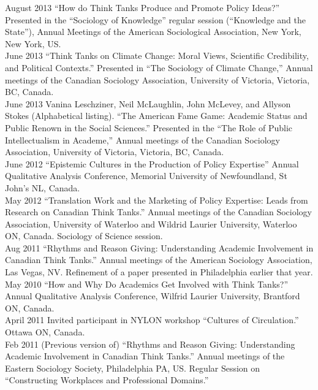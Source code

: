 \documentclass[11pt,usenames,dvipsnames]{article}
\begin{document}
\ind August 2013 ``How do Think Tanks Produce and Promote Policy Ideas?'' Presented in the ``Sociology of Knowledge'' regular session (``Knowledge and the State''), Annual Meetings of the American Sociological Association, New York, New York, US. \\

\ind June 2013 ``Think Tanks on Climate Change: Moral Views, Scientific Credibility, and Political Contexts.'' Presented in ``The Sociology of Climate Change,'' Annual meetings of the Canadian Sociology Association, University of Victoria, Victoria, BC, Canada. \\

\ind June 2013 Vanina Leschziner, Neil McLaughlin, John McLevey, and Allyson Stokes (Alphabetical listing). ``The American Fame Game: Academic Status and Public Renown in the Social Sciences.'' Presented in the ``The Role of Public Intellectualism in Academe,'' Annual meetings of the Canadian Sociology Association, University of Victoria, Victoria, BC, Canada. \\

\ind June 2012 ``Epistemic Cultures in the Production of Policy Expertise'' Annual Qualitative Analysis Conference, Memorial University of Newfoundland, St John's NL, Canada.\\

\ind May 2012 ``Translation Work and the Marketing of Policy Expertise: Leads from Research on Canadian Think Tanks.'' Annual meetings of the Canadian Sociology Association, University of Waterloo and Wildrid Laurier University, Waterloo ON, Canada. Sociology of Science session.\\

\ind Aug 2011 ``Rhythms and Reason Giving: Understanding Academic Involvement in Canadian Think Tanks.'' Annual meetings of the American Sociology Association, Las Vegas, NV. Refinement of a paper presented in Philadelphia earlier that year. \\

\ind May 2010 ``How and Why Do Academics Get Involved with Think Tanks?'' Annual Qualitative Analysis Conference, Wilfrid Laurier University, Brantford ON, Canada.\\

\ind April 2011 Invited participant in NYLON workshop ``Cultures of Circulation.'' Ottawa ON, Canada.\\

\ind Feb 2011 (Previous version of) ``Rhythms and Reason Giving: Understanding Academic Involvement in Canadian Think Tanks.'' Annual meetings of the Eastern Sociology Society, Philadelphia PA, US. Regular Session on ``Constructing Workplaces and Professional Domains.''\\
\end{document}
